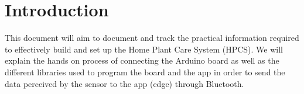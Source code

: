 \section{Introduction}
This document will aim to document and track the practical information required to effectively build and set up the Home Plant Care System (HPCS). We will explain the hands on process of connecting the Arduino board as well as the different libraries used to program the board and the app in order to send the data perceived by the sensor to the app (edge) through Bluetooth. 
